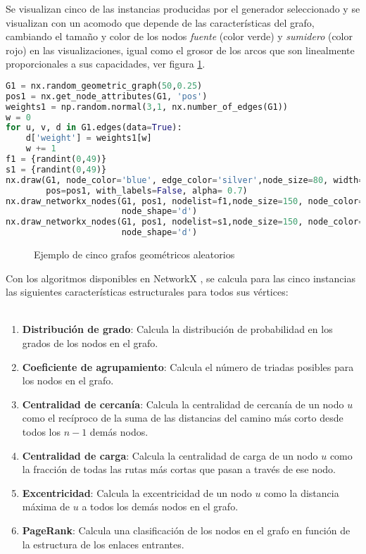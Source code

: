 \documentclass[a4paper, 11pt]{article}
\begin{document}
Se visualizan cinco de las instancias producidas por el generador seleccionado y se visualizan con un acomodo que depende de las características del grafo, cambiando el tamaño y color de los nodos \textit{fuente} (color verde) y \textit{sumidero} (color rojo) en las visualizaciones, igual como el grosor de los arcos que son linealmente proporcionales a sus capacidades, ver figura \ref{figure1}.

\begin{lstlisting}[language=Python]
G1 = nx.random_geometric_graph(50,0.25)
pos1 = nx.get_node_attributes(G1, 'pos')
weights1 = np.random.normal(3,1, nx.number_of_edges(G1))
w = 0
for u, v, d in G1.edges(data=True):
    d['weight'] = weights1[w]
    w += 1
f1 = {randint(0,49)}
s1 = {randint(0,49)}
nx.draw(G1, node_color='blue', edge_color='silver',node_size=80, width=weights1,
        pos=pos1, with_labels=False, alpha= 0.7)
nx.draw_networkx_nodes(G1, pos1, nodelist=f1,node_size=150, node_color='green',
                       node_shape='d')
nx.draw_networkx_nodes(G1, pos1, nodelist=s1,node_size=150, node_color='red',
                       node_shape='d')

\end{lstlisting}


\begin{figure}[H]
\centering
{}
\caption{Ejemplo de cinco grafos geométricos aleatorios}
\label{figure1}
\end{figure}

Con los algoritmos disponibles en \color{blue} NetworkX\color{black} \cite{networkx}, se calcula para las cinco instancias las siguientes características estructurales para todos sus vértices:
\\
\\


\begin{enumerate}
\item \textbf{Distribución de grado}: Calcula la distribución de probabilidad en los grados de los nodos en el grafo.
\item \textbf{Coeficiente de agrupamiento}: Calcula el número de triadas posibles para los nodos en el grafo.
\item \textbf{Centralidad de cercanía}: Calcula la centralidad de cercanía de un nodo $u$ como el recíproco de la suma de las distancias del camino más corto desde todos los $n-1$ demás nodos.
\item \textbf{Centralidad de carga}: Calcula la centralidad de carga de un nodo $u$ como la fracción de todas las rutas más cortas que pasan a través de ese nodo.
\item \textbf{Excentricidad}: Calcula la excentricidad de un nodo $u$ como la distancia máxima de $u$ a todos los demás nodos en el grafo.
\item \textbf{PageRank}: Calcula una clasificación de los nodos en el grafo en función de la estructura de los enlaces entrantes.
\end{enumerate}
\end{document}
